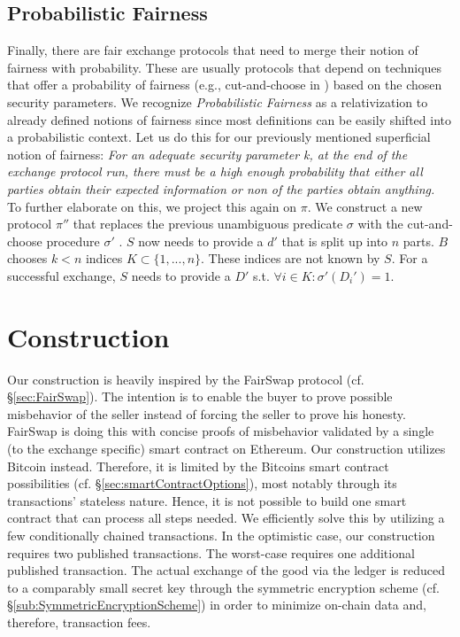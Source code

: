 \documentclass{cacthesis}
\newcounter{protocol}
\begin{document}
        \section{Probabilistic Fairness}
        \label{sec:ProbabilisticFairness}
        Finally, there are fair exchange protocols that need to merge their notion of fairness with probability. These are usually protocols that depend on techniques that offer a probability of fairness (e.g., cut-and-choose in \cite{DELGADOSEGURA2020832}) based on the chosen security parameters. We recognize \textit{Probabilistic Fairness} as a relativization to already defined notions of fairness since most definitions can be easily shifted into a probabilistic context. Let us do this for our previously mentioned superficial notion of fairness: \textit{For an adequate security parameter k, at the end of the exchange protocol run, there must be a high enough probability that either all parties obtain their expected information or non of the parties obtain anything.} \\
        To further elaborate on this, we project this again on $\pi$. We construct a new protocol $\pi''$ that replaces the previous unambiguous predicate $\sigma$ with the cut-and-choose procedure $\sigma'$ . $S$ now needs to provide a $d'$ that is split up into $n$ parts. $B$ chooses $k < n$ indices $K \subset \{1, ..., n\}$. These indices are not known by $S$. For a successful exchange, $S$ needs to provide a $D'$ s.t. $\forall i\in K:\sigma'\left( D_{i}'\right) =1$. \\

		
	\chapter{Construction}
	   \label{ch:Construction}
	   Our construction is heavily inspired by the FairSwap protocol (cf. §\ref{sec:FairSwap}). The intention is to enable the buyer to prove possible misbehavior of the seller instead of forcing the seller to prove his honesty. FairSwap is doing this with concise proofs of misbehavior validated by a single (to the exchange specific) smart contract on Ethereum. Our construction utilizes Bitcoin instead. Therefore, it is limited by the Bitcoins smart contract possibilities (cf. §\ref{sec:smartContractOptions}), most notably through its transactions' stateless nature. Hence, it is not possible to build one smart contract that can process all steps needed. We efficiently solve this by utilizing a few conditionally chained transactions. In the optimistic case, our construction requires two published transactions. The worst-case requires one additional published transaction. The actual exchange of the good via the ledger is reduced to a comparably small secret key through the symmetric encryption scheme (cf. §\ref{sub:SymmetricEncryptionScheme}) in order to minimize on-chain data and, therefore, transaction fees.
	   
\end{document}
